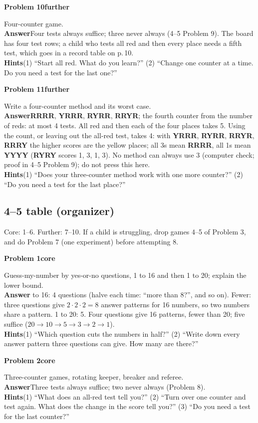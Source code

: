 \documentclass[11pt]{article}
\newcommand{\cd}[1]{\mbox{\textsf{\textbf{#1}}}}   %
\newcommand{\core}{\textcolor{tagcore}{\textbf{core}}}
\newcommand{\further}{\textcolor{tagmore}{\textbf{further}}}
\newcommand{\pb}[3]{\par\needspace{5\baselineskip}\medskip\textbf{Problem #1}\enspace{\small page #2}\enspace\textperiodcentered\enspace #3\par\nopagebreak}
\newcommand{\lab}[1]{\textbf{#1}\enspace}
\newcommand{\hints}[1]{\lab{Hints}#1}
\begin{document}
\pb{10}{9}{\further}
Four-counter game.\\
\lab{Answer}Four tests always suffice; three never always (4--5 Problem 9). The board has four test rows; a child who tests all red and then every place needs a fifth test, which goes in a record table on p.\,10.\\
\hints{(1) ``Start all red. What do you learn?'' (2) ``Change one counter at a time. Do you need a test for the last one?''}

\pb{11}{10}{\further}
Write a four-counter method and its worst case.\\
\lab{Answer}\cd{RRRR}, \cd{YRRR}, \cd{RYRR}, \cd{RRYR}; the fourth counter from the number of reds: at most 4 tests. All red and then each of the four places takes 5. Using the count, or leaving out the all-red test, takes 4: with \cd{YRRR}, \cd{RYRR}, \cd{RRYR}, \cd{RRRY} the higher scores are the yellow places; all 3s mean \cd{RRRR}, all 1s mean \cd{YYYY} (\cd{RYRY} scores 1, 3, 1, 3). No method can always use 3 (computer check; proof in 4--5 Problem 9); do not press this here.\\
\hints{(1) ``Does your three-counter method work with one more counter?'' (2) ``Do you need a test for the last place?''}

\subsection{4--5 table (organizer)}
Core: 1--6. Further: 7--10. If a child is struggling, drop games 4--5 of Problem 3, and do Problem 7 (one experiment) before attempting 8.

\pb{1}{1}{\core}
Guess-my-number by yes-or-no questions, 1 to 16 and then 1 to 20; explain the lower bound.\\
\lab{Answer}1 to 16: 4 questions (halve each time: ``more than 8?'', and so on). Fewer: three questions give $2\cdot2\cdot2=8$ answer patterns for 16 numbers, so two numbers share a pattern. 1 to 20: 5. Four questions give 16 patterns, fewer than 20; five suffice ($20\to10\to5\to3\to2\to1$).\\
\hints{(1) ``Which question cuts the numbers in half?'' (2) ``Write down every answer pattern three questions can give. How many are there?''}

\pb{2}{2}{\core}
Three-counter games, rotating keeper, breaker and referee.\\
\lab{Answer}Three tests always suffice; two never always (Problem 8).\\
\hints{(1) ``What does an all-red test tell you?'' (2) ``Turn over one counter and test again. What does the change in the score tell you?'' (3) ``Do you need a test for the last counter?''}
\end{document}
